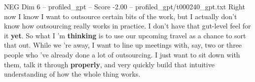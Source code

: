 \begin{textsample}{NEG Dim 6 – profiled\_gpt – Score -2.00 – profiled\_gpt/t000240\_gpt.txt}  \label{ex:f6_neg_016}
Right now I know I want to outsource certain bits of the work, but I actually don't know how outsourcing really works in practice.
I don't have that gut-level feel for it \textbf{yet}.
So what I ’m \textbf{thinking} is to use our upcoming travel as a chance to sort that out.
While we ’re away, I want to line up meetings with, say, two or three people who ’ve already done a lot of outsourcing.
I just want to sit down with them, talk it through \textbf{properly}, and very quickly build that intuitive understanding of how the whole thing works.

\end{textsample}
